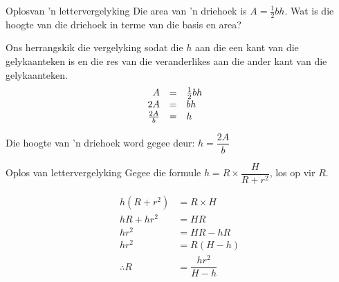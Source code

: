 
\begin{wex}
{Oplosvan 'n lettervergelyking}
{
Die area van ’n driehoek is $A=\frac{1}{2}bh$. Wat is die hoogte van die driehoek in terme van die basis en area?
}
{
Ons herrangskik die vergelyking sodat die $h$ aan die een kant
van die gelykaanteken is en die res van die veranderlikes aan die
ander kant van die gelykaanteken.
\begin{equation*}
    \begin{array}{cccc}\hfill A& =& \frac{1}{2}bh\hfill & \\
	\hfill 2A& =& bh\hfill & \hfill \\
	\hfill \frac{2A}{b}& =& h\hfill 
    \end{array}
\end{equation*}

Die hoogte van ’n driehoek word gegee deur: $h=\dfrac{2A}{b}$
} 
\end{wex}

\begin{wex}
{Oplos van lettervergelyking}
{
Gegee die formule $h=  R\times \dfrac{H}{R+r^2}$, los op vir $R$.
}
{
\begin{align*}
  h(R+r^2) &= R \times H \\
  hR + hr^2 &= HR \\
  hr^2 &= HR - hR \\
  hr^2 &= R(H - h) \\
  \therefore R &= \dfrac{hr^2}{H-h}
\end{align*}


} 
\end{wex}

